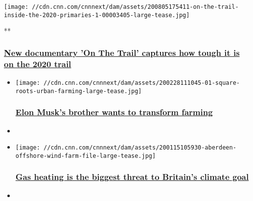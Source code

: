 \texttt{[image: //cdn.cnn.com/cnnnext/dam/assets/200805175411-on-the-trail-inside-the-2020-primaries-1-00003405-large-tease.jpg]}

**

\hypertarget{new-documentary-on-the-trail-captures-how-tough-it-is-on-the-2020-trail}{%
\subsubsection{\texorpdfstring{\href{/videos/media/2020/08/07/on-the-trail-hbo-max-bash.cnn}{New
documentary 'On The Trail' captures how tough it is on the 2020
trail}}{New documentary 'On The Trail' captures how tough it is on the 2020 trail}}\label{new-documentary-on-the-trail-captures-how-tough-it-is-on-the-2020-trail}}

\begin{itemize}
\item
  \href{/2020/02/28/business/musk-vertical-farm/index.html}{}

  \texttt{[image: //cdn.cnn.com/cnnnext/dam/assets/200228111045-01-square-roots-urban-farming-large-tease.jpg]}

  \hypertarget{elon-musks-brother-wants-to-transform-farming}{%
  \subsubsection{\texorpdfstring{\href{/2020/02/28/business/musk-vertical-farm/index.html}{Elon
  Musk's brother wants to transform
  farming}}{Elon Musk's brother wants to transform farming}}\label{elon-musks-brother-wants-to-transform-farming}}
\item
\end{itemize}

\begin{itemize}
\item
  \href{/2020/01/18/business/uk-net-zero-emissions-2050/index.html}{}

  \texttt{[image: //cdn.cnn.com/cnnnext/dam/assets/200115105930-aberdeen-offshore-wind-farm-file-large-tease.jpg]}

  \hypertarget{gas-heating-is-the-biggest-threat-to-britains-climate-goal}{%
  \subsubsection{\texorpdfstring{\href{/2020/01/18/business/uk-net-zero-emissions-2050/index.html}{Gas
  heating is the biggest threat to Britain's climate
  goal}}{Gas heating is the biggest threat to Britain's climate goal}}\label{gas-heating-is-the-biggest-threat-to-britains-climate-goal}}
\item
\end{itemize}

